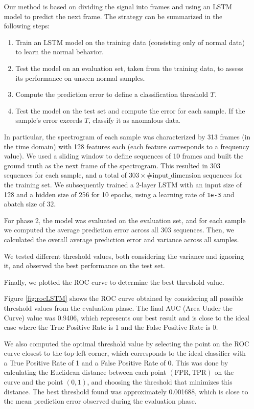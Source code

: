 \documentclass[ngerman]{scrartcl}
\begin{document}
Our method is based on dividing the signal into frames and using an LSTM model to predict the next frame. The strategy can be summarized in the following steps:
\begin{enumerate}
  \item Train an LSTM model on the training data (consisting only of normal data) to learn the normal behavior.
  \item Test the model on an evaluation set, taken from the training data, to assess its performance on unseen normal samples.
  \item Compute the prediction error to define a classification threshold \( T \).
  \item Test the model on the test set and compute the error for each sample. If the sample’s error exceeds \( T \), classify it as anomalous data.
\end{enumerate}


In particular, the spectrogram of each sample was characterized by 313 frames (in the time domain) with 128 features each (each feature corresponds to a frequency value). 
We used a sliding window to define sequences of 10 frames and built the ground truth as the next frame of the spectrogram. 
This resulted in 303 sequences for each sample, and a total of \(303 \times \text{\#input\_dimension}\) sequences for the training set.
We subsequently trained a 2-layer LSTM with an input size of 128 and a hidden size of 256 for 10 epochs, using a learning rate of \texttt{1e-3} and  abatch size of 32.

For phase \(2\), the model was evaluated on the evaluation set, and for each sample we computed the average prediction error across all 303 sequences.
Then, we calculated the overall average prediction error and variance across all samples. 

We tested different threshold values, both considering the variance and ignoring it, and observed the best performance on the test set.

Finally, we plotted the ROC curve to determine the best threshold value.

Figure \ref{fig:rocLSTM} shows the ROC curve obtained by considering all possible threshold values from the evaluation phase. The final AUC (Area Under the Curve) value was 0.9406, which represents our best result and is close to the ideal case where the True Positive Rate is 1 and the False Positive Rate is 0.

We also computed the optimal threshold value by selecting the point on the ROC curve closest to the top-left corner, which corresponds to the ideal classifier with a True Positive Rate of 1 and a False Positive Rate of 0. 
This was done by calculating the Euclidean distance between each point \((\text{FPR}, \text{TPR})\) on the curve and the point \((0, 1)\), and choosing the threshold that minimizes this distance. 
The best threshold found was approximately 0.001688, which is close to the mean prediction error observed during the evaluation phase.
\end{document}
